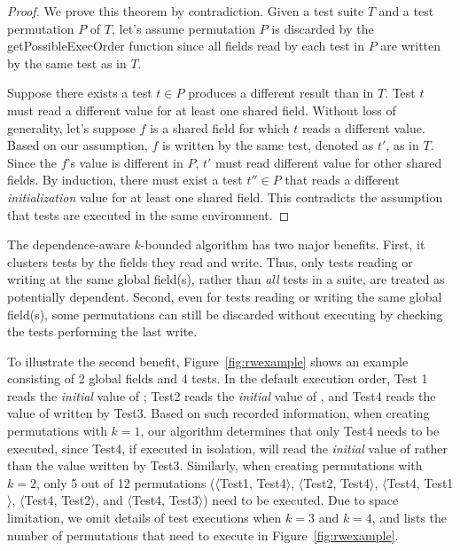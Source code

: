 \begin{proof}
We prove this theorem by contradiction. Given a test
suite $T$ and a test permutation $P$ of $T$, let's assume
permutation $P$ is discarded by the getPossibleExecOrder function
since all fields read by each test in $P$ are written
by the same test as in $T$.


Suppose there exists a test $t \in P$ produces a different result
than in $T$. Test $t$ must read a different value
for at least one shared field. Without loss of generality,
let's suppose $f$ is a shared field for which $t$ reads
a different value. Based on our assumption, 
$f$ is written by the same test, denoted as $t'$, as in $T$.
Since the $f$'s value is different in $P$, $t'$
must read different value for other shared fields.
By induction, there must exist a test $t'' \in P$ that 
reads a different \textit{initialization} value
for at least one shared field. This contradicts
the assumption that tests are executed in the same environment.
\end{proof}

The dependence-aware $k$-bounded algorithm has two major benefits.
First, it clusters tests by the fields they
read and write. Thus, only tests reading or writing at
the same global field(s), rather than \textit{all} tests
in a suite, are treated as potentially dependent.
Second, even for tests reading or writing the same global
field(s), some permutations can still be discarded
without executing by checking the tests performing the last write.


To illustrate the second benefit, Figure~\ref{fig:rwexample}
shows an example
consisting of 2 global fields and 4 tests. In the default execution
order, Test 1 reads the \textit{initial} value of ;
Test2 reads the \textit{initial} value of , and Test4
reads the value of  written by Test3.
Based on such recorded information, when creating permutations with $k=1$,
our algorithm determines that only
Test4 needs to be executed, since Test4, if executed in isolation,
will read the \textit{initial} value of  rather than the 
value written by Test3. Similarly, when creating permutations with $k=2$,
only 5 out of 12 permutations ($\langle$Test1, Test4$\rangle$,
$\langle$Test2, Test4$\rangle$, $\langle$Test4, Test1$\rangle$,
$\langle$Test4, Test2$\rangle$, and $\langle$Test4, Test3$\rangle$) need to be executed.
Due to space limitation, we omit details of test executions when
$k=3$ and $k=4$, and lists the number of permutations that need
to execute in Figure~\ref{fig:rwexample}.

